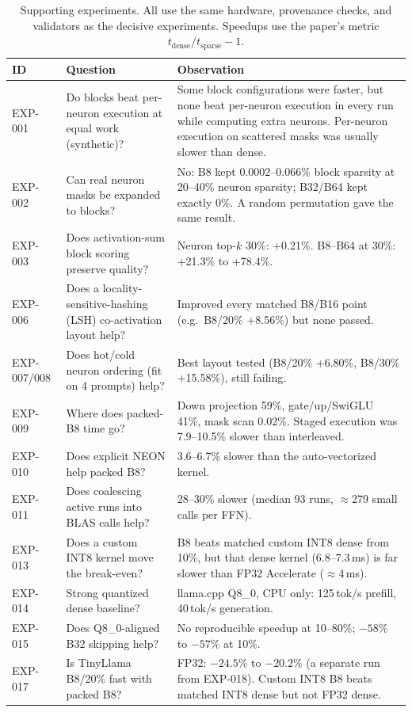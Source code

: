 \begin{table}[t]
\centering
\caption{Supporting experiments. All use the same hardware, provenance
checks, and validators as the decisive experiments. Speedups use the paper's
metric $t_{\text{dense}}/t_{\text{sparse}}-1$.}
\label{tab:supporting}
\small
\begin{tabular}{@{}lp{}p{}@{}}
\toprule
ID & Question & Observation \\
\midrule
EXP-001 & Do blocks beat per-neuron execution at equal work (synthetic)? &
  Some block configurations were faster, but none beat per-neuron execution in
  every run while computing extra neurons. Per-neuron execution on scattered
  masks was usually slower than dense. \\
EXP-002 & Can real neuron masks be expanded to blocks? &
  No: B8 kept 0.0002--0.066\% block sparsity at 20--40\% neuron sparsity;
  B32/B64 kept exactly 0\%. A random permutation gave the same result. \\
EXP-003 & Does activation-sum block scoring preserve quality? &
  Neuron top-$k$ 30\%: +0.21\%. B8--B64 at 30\%: +21.3\% to +78.4\%. \\
EXP-006 & Does a locality-sensitive-hashing (LSH) co-activation layout help? &
  Improved every matched B8/B16 point (e.g.\ B8/20\% +8.56\%) but none passed. \\
EXP-007/008 & Does hot/cold neuron ordering (fit on 4 prompts) help? &
  Best layout tested (B8/20\% +6.80\%, B8/30\% +15.58\%), still failing. \\
EXP-009 & Where does packed-B8 time go? &
  Down projection 59\%, gate/up/SwiGLU 41\%, mask scan 0.02\%. Staged
  execution was 7.9--10.5\% slower than interleaved. \\
EXP-010 & Does explicit NEON help packed B8? &
  3.6--6.7\% slower than the auto-vectorized kernel. \\
EXP-011 & Does coalescing active runs into BLAS calls help? &
  28--30\% slower (median 93 runs, $\approx$279 small calls per FFN). \\
EXP-013 & Does a custom INT8 kernel move the break-even? &
  B8 beats matched custom INT8 dense from 10\%, but that dense kernel
  (6.8--7.3\,ms) is far slower than FP32 Accelerate ($\approx$4\,ms). \\
EXP-014 & Strong quantized dense baseline? &
  llama.cpp Q8\_0, CPU only: 125\,tok/s prefill, 40\,tok/s generation. \\
EXP-015 & Does Q8\_0-aligned B32 skipping help? &
  No reproducible speedup at 10--80\%; $-58\%$ to $-57\%$ at 10\%. \\
EXP-017 & Is TinyLlama B8/20\% fast with packed B8? &
  FP32: $-24.5\%$ to $-20.2\%$ (a separate run from EXP-018). Custom INT8 B8
  beats matched INT8 dense but not FP32 dense. \\
\bottomrule
\end{tabular}
\end{table}
